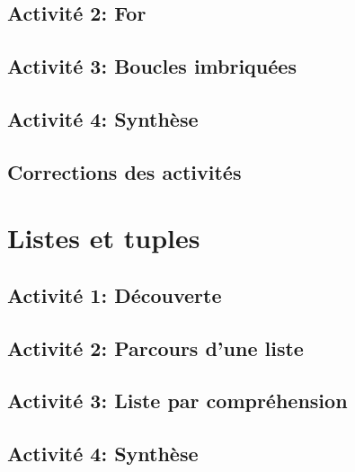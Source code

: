 \documentclass[
]{book}
\begin{document}
\hypertarget{activituxe9-2-for}{%
\section{Activité 2: For}\label{activituxe9-2-for}}

\hypertarget{activituxe9-3-boucles-imbriquuxe9es}{%
\section{Activité 3: Boucles imbriquées}\label{activituxe9-3-boucles-imbriquuxe9es}}

\hypertarget{activituxe9-4-synthuxe8se}{%
\section{Activité 4: Synthèse}\label{activituxe9-4-synthuxe8se}}

\hypertarget{corrections-des-activituxe9s}{%
\section{Corrections des activités}\label{corrections-des-activituxe9s}}

\hypertarget{listes-et-tuples}{%
\chapter{Listes et tuples}\label{listes-et-tuples}}

\hypertarget{activituxe9-1-duxe9couverte}{%
\section{Activité 1: Découverte}\label{activituxe9-1-duxe9couverte}}

\hypertarget{activituxe9-2-parcours-dune-liste}{%
\section{Activité 2: Parcours d'une liste}\label{activituxe9-2-parcours-dune-liste}}

\hypertarget{activituxe9-3-liste-par-compruxe9hension}{%
\section{Activité 3: Liste par compréhension}\label{activituxe9-3-liste-par-compruxe9hension}}

\hypertarget{activituxe9-4-synthuxe8se-1}{%
\section{Activité 4: Synthèse}\label{activituxe9-4-synthuxe8se-1}}
\end{document}
